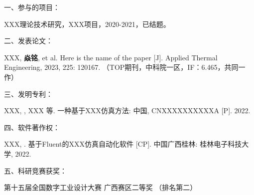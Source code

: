 
\noindent %
一、参与的项目：
\begingroup
\setlength{\itemsep}{0bp}\setlength{\parskip}{0pt}
    \begin{enumerate}[label={[\arabic*]}] %
        \item XXX理论技术研究，XXX项目，2020-2021，已结题。
        \end{enumerate}
\endgroup
\vspace{3mm}

\noindent %
二、发表论文：
\begingroup
\setlength{\itemsep}{0bp}\setlength{\parskip}{0pt}
    \begin{enumerate}[label={[\arabic*]}] 
        \item XXX, {\bfseries{焱铭}}, et al. Here is the name of the paper [J]. Applied Thermal Engineering, 2023, 225: 120167. （TOP期刊，中科院一区，IF：6.465，共同一作）
    \end{enumerate}
\endgroup
\vspace{3mm}

\noindent %
三、发明专利：
\begingroup
\setlength{\itemsep}{0bp}\setlength{\parskip}{0pt}
    \begin{enumerate}[label={[\arabic*]}]  
        \item XXX, , XXX 等. 一种基于XXX仿真方法: 中国, CNXXXXXXXXXXA [P]. 2022. 
    \end{enumerate}
\endgroup
\vspace{3mm}

\noindent %
四、软件著作权：
\begingroup
\setlength{\itemsep}{0bp}\setlength{\parskip}{0pt}
    \begin{enumerate}[label={[\arabic*]}]  
        \item XXX, . 基于Fluent的XXX仿真自动化软件 [CP]. 中国广西桂林: 桂林电子科技大学, 2022.
    \end{enumerate}
\endgroup
\vspace{3mm}

\noindent %
五、科研竞赛获奖：
\begingroup
    \setlength{\itemsep}{0bp}\setlength{\parskip}{0pt}
    \begin{enumerate}[label={[\arabic*]}]  
        \item 第十五届全国数字工业设计大赛 广西赛区二等奖 （排名第二）   
    \end{enumerate}
\endgroup


